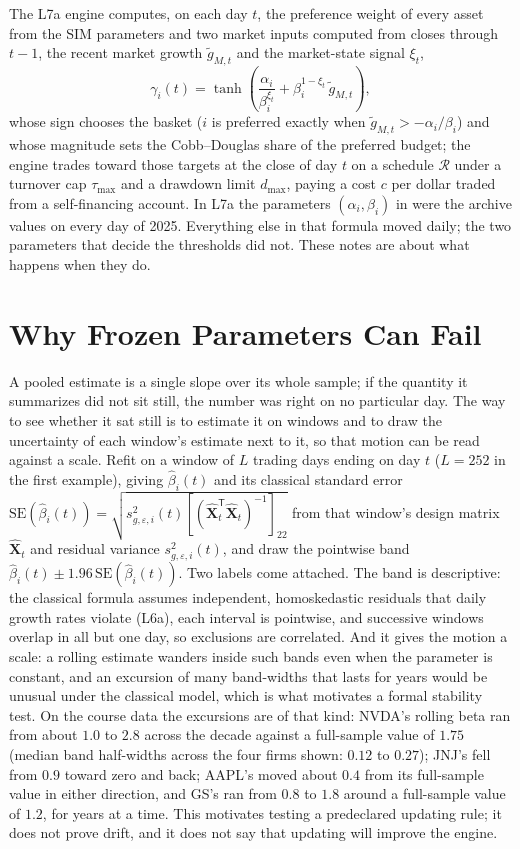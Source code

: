 \documentclass[11pt]{article}
\newcommand{\bX}{\hat{\mathbf X}}
\newcommand{\Rset}{\mathcal R}
\newcommand{\gt}{\tilde g_{M,t}}
\begin{document}
The L7a engine computes, on each day $t$, the preference weight of every asset from the SIM parameters and two market inputs computed from closes through $t-1$, the recent market growth $\gt$ and the market-state signal $\xi_t$,
\begin{equation}
  \label{eq:preference}
  \gamma_i(t)=\tanh\!\left(\frac{\alpha_i}{\beta_i^{\xi_t}}+\beta_i^{1-\xi_t}\,\gt\right),
\end{equation}
whose sign chooses the basket ($i$ is preferred exactly when $\gt>-\alpha_i/\beta_i$) and whose magnitude sets the Cobb--Douglas share of the preferred budget; the engine trades toward those targets at the close of day $t$ on a schedule $\Rset$ under a turnover cap $\tau_{\max}$ and a drawdown limit $d_{\max}$, paying a cost $c$ per dollar traded from a self-financing account. In L7a the parameters $(\alpha_i,\beta_i)$ in  were the archive values on every day of 2025. Everything else in that formula moved daily; the two parameters that decide the thresholds did not. These notes are about what happens when they do.

\section{Why Frozen Parameters Can Fail}

A pooled estimate is a single slope over its whole sample; if the quantity it summarizes did not sit still, the number was right on no particular day. The way to see whether it sat still is to estimate it on windows and to draw the uncertainty of each window's estimate next to it, so that motion can be read against a scale. Refit  on a window of $L$ trading days ending on day $t$ ($L=252$ in the first example), giving $\hat\beta_i(t)$ and its classical standard error $\mathrm{SE}(\hat\beta_i(t))=\sqrt{s^2_{g,\varepsilon,i}(t)[(\bX_t^{\mathsf T}\bX_t)^{-1}]_{22}}$ from that window's design matrix $\bX_t$ and residual variance $s^2_{g,\varepsilon,i}(t)$, and draw the pointwise band $\hat\beta_i(t)\pm1.96\,\mathrm{SE}(\hat\beta_i(t))$. Two labels come attached. The band is descriptive: the classical formula assumes independent, homoskedastic residuals that daily growth rates violate (L6a), each interval is pointwise, and successive windows overlap in all but one day, so exclusions are correlated. And it gives the motion a scale: a rolling estimate wanders inside such bands even when the parameter is constant, and an excursion of many band-widths that lasts for years would be unusual under the classical model, which is what motivates a formal stability test. On the course data the excursions are of that kind: NVDA's rolling beta ran from about $1.0$ to $2.8$ across the decade against a full-sample value of $1.75$ (median band half-widths across the four firms shown: $0.12$ to $0.27$); JNJ's fell from $0.9$ toward zero and back; AAPL's moved about $0.4$ from its full-sample value in either direction, and GS's ran from $0.8$ to $1.8$ around a full-sample value of $1.2$, for years at a time. This motivates testing a predeclared updating rule; it does not prove drift, and it does not say that updating will improve the engine.
\end{document}
